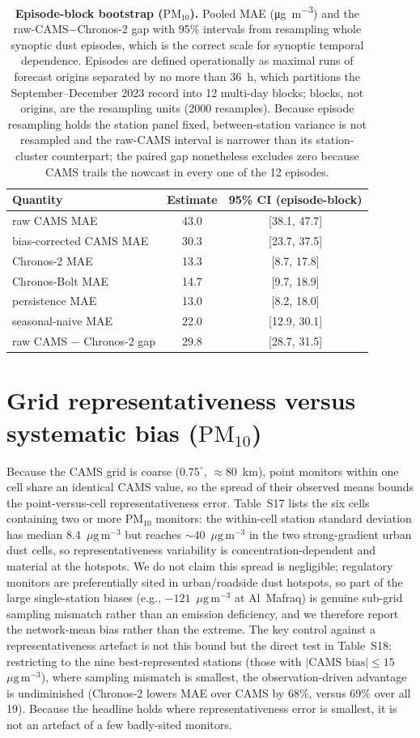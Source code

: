 \documentclass[11pt]{article}
\newcommand*{\ugm}{\ensuremath{\mu\mathrm{g\,m^{-3}}}}
\newcommand*{\pmten}{\ensuremath{\mathrm{PM_{10}}}}
\begin{document}
\begin{table}[htbp]\centering\footnotesize
\caption{\textbf{Episode-block bootstrap (\pmten{}).} Pooled MAE (\si{\micro\gram\per\cubic\metre}) and the raw-CAMS$-$Chronos-2 gap with 95\% intervals from resampling whole synoptic dust episodes, which is the correct scale for synoptic temporal dependence. Episodes are defined operationally as maximal runs of forecast origins separated by no more than 36~h, which partitions the September--December 2023 record into 12 multi-day blocks; blocks, not origins, are the resampling units (2000 resamples). Because episode resampling holds the station panel fixed, between-station variance is not resampled and the raw-CAMS interval is narrower than its station-cluster counterpart; the paired gap nonetheless excludes zero because CAMS trails the nowcast in every one of the 12 episodes.}
\begin{tabular}{lcc}\toprule
Quantity & Estimate & 95\% CI (episode-block) \\ \midrule
raw CAMS MAE & 43.0 & [38.1, 47.7] \\
bias-corrected CAMS MAE & 30.3 & [23.7, 37.5] \\
Chronos-2 MAE & 13.3 & [8.7, 17.8] \\
Chronos-Bolt MAE & 14.7 & [9.7, 18.9] \\
persistence MAE & 13.0 & [8.2, 18.0] \\
seasonal-naive MAE & 22.0 & [12.9, 30.1] \\
raw CAMS $-$ Chronos-2 gap & 29.8 & [28.7, 31.5] \\
\bottomrule\end{tabular}\end{table}

\section{Grid representativeness versus systematic bias (\pmten{})}
Because the CAMS grid is coarse ($0.75^\circ$, $\approx$80~km), point monitors within one cell share an identical CAMS value, so the spread of their observed means bounds the point-versus-cell representativeness error. Table~S17 lists the six cells containing two or more \pmten{} monitors: the within-cell station standard deviation has median $8.4$~\ugm{} but reaches $\sim40$~\ugm{} in the two strong-gradient urban dust cells, so representativeness variability is concentration-dependent and material at the hotspots. We do not claim this spread is negligible; regulatory monitors are preferentially sited in urban/roadside dust hotspots, so part of the large single-station biases (e.g., $-121$~\ugm{} at Al~Mafraq) is genuine sub-grid sampling mismatch rather than an emission deficiency, and we therefore report the network-mean bias rather than the extreme. The key control against a representativeness artefact is not this bound but the direct test in Table~S18: restricting to the nine best-represented stations (those with $|\text{CAMS bias}|\leq15$~\ugm), where sampling mismatch is smallest, the observation-driven advantage is undiminished (Chronos-2 lowers MAE over CAMS by $68\%$, versus $69\%$ over all 19). Because the headline holds where representativeness error is smallest, it is not an artefact of a few badly-sited monitors.
\end{document}
